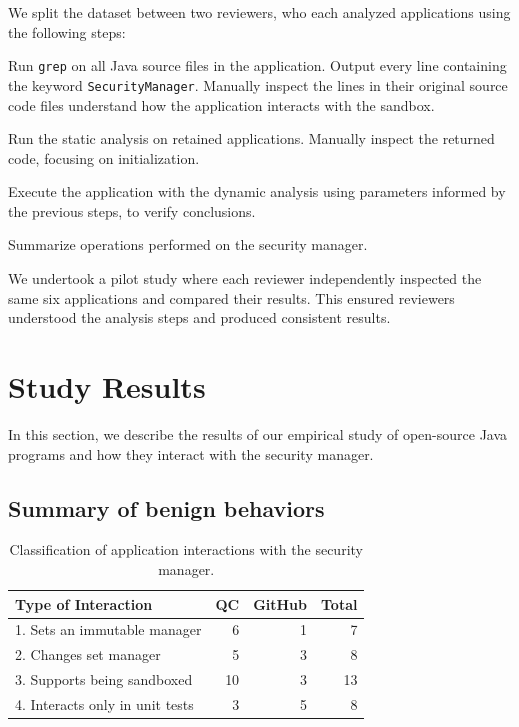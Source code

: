 \documentclass{sig-alternate}
\begin{document}
We split the dataset between two reviewers, who each analyzed
applications using the following steps:

\begin{flushenum}\setlength{\parskip}{0pt}
  \setlength{\parsep}{0pt}
  \setlength{\itemsep}{0pt}
\item Run \texttt{grep} on all Java source files in the application.
Output every line containing the keyword \texttt{SecurityManager}.
Manually inspect the lines in their original source code files understand
how the application interacts with the sandbox.
\item Run the static analysis on retained applications. Manually inspect the
  returned code, focusing on initialization. 
\item Execute the application with the dynamic analysis using parameters
  informed by the previous steps, 
to verify conclusions.
\item Summarize operations performed
on the security manager.
\end{flushenum}

We undertook a pilot study where each reviewer
independently inspected the same six applications and compared their
results. This ensured reviewers understood the analysis steps and produced
consistent results.


\section{Study Results}\label{sec:Study-results}

In this section, we describe the results of our empirical study of open-source
Java programs and how they interact with the security manager. 

\subsection{Summary of benign behaviors}\label{sub:Evaluation-of-the-hypotheses}


\begin{table}
\caption{Classification of application
  interactions \label{tab:Classification-of-Application}
with the security manager.}
\begin{tabular}{lrrr}
\toprule 
Type of Interaction & QC & GitHub & Total\tabularnewline
\midrule
1. Sets an immutable manager & 6 & 1 & 7\tabularnewline
2. Changes set manager & 5 & 3 & 8\tabularnewline
3. Supports being sandboxed & 10 & 3 & 13\tabularnewline
4. Interacts only in unit tests & 3 & 5 & 8\tabularnewline
\bottomrule
\end{tabular}
\end{table}
\end{document}
